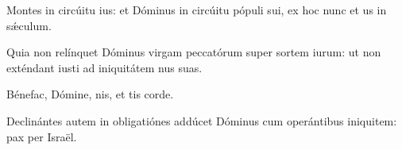 \item {}

\item Montes in circúitu ius: \psstar{} et Dóminus in circúitu pópuli sui, ex hoc nunc et us in sǽculum.

\item Quia non relínquet Dóminus virgam peccatórum super sortem iurum:\psstar{} ut non exténdant iusti ad iniquitátem nus suas.

\item Bénefac, Dómine, nis,\psstar{} et tis corde.

\item Declinántes autem in obligatiónes addúcet Dóminus cum operántibus iniquitem:\psstar{} pax per Israël.
